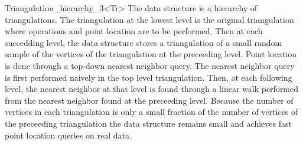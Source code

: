 \begin{ccRefClass}{Triangulation_hierarchy_3<Tr>}
\ccImplementation
The data structure is a hierarchy 
of triangulations. The triangulation at the lowest level is
the original triangulation where operations and point location are to 
be performed.
Then at each succedding level, the data structure
stores a triangulation of a small random sample of the vertices
of the triangulation at the preceeding level. Point location
is done through a top-down nearest neighbor query.
The nearest neighbor query is first
performed naively in the top level triangulation.
Then, at each following level, the nearest neighbor at that level
is found through a linear walk performed from
the nearest neighbor found at the preceeding level.
Because the number of vertices in each triangulation is only a small
fraction of the number of vertices of the preceeding triangulation 
the data structure remains small and achieves fast point location 
queries on real
data. 

\ccSeeAlso
{}\\

\end{ccRefClass}
